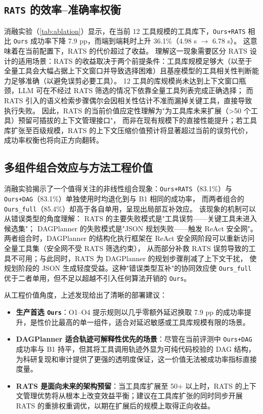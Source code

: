 \subsection{\texttt{RATS} 的效率--准确率权衡}\label{sec:analysis-rats}

消融实验（\autoref{tab:ablation}）显示，在当前 12 工具规模的工具库下，\texttt{Ours+RATS} 相比 \texttt{Ours} 成功率下降 7.9 pp，而端到端耗时上升 36.1\%（4.98 s $\to$ 6.78 s）。
这意味着在当前配置下，RATS 的代价超过了收益。
理解这一现象需要区分 RATS 设计的适用场景：RATS 的收益取决于两个前提条件：工具库规模足够大（以至于全量工具会大幅占据上下文窗口并导致选择困难）且基座模型的工具相关性判断能力足够准确（以避免误剪必要工具）。
12 工具的库规模尚未达到上下文窗口瓶颈，LLM 可在不经过 RATS 筛选的情况下依靠全量工具列表完成正确选择；
而 RATS 引入的语义检索步骤偶尔会因相关性估计不准而漏掉关键工具，直接导致执行失败。
因此，RATS 的当前价值应定性理解为"为工具库未来扩展（>50 个工具）预留可插拔的上下文管理接口"，
而非在现有规模下的直接性能提升；若工具库扩张至百级规模，RATS 的上下文压缩价值预计将显著超过当前的误剪代价，成功率权衡也将向正方向翻转。

\subsection{多组件组合效应与方法工程价值}\label{sec:analysis-combination}

消融实验揭示了一个值得关注的非线性组合现象：\texttt{Ours+RATS}（83.1\%）与 \texttt{Ours+DAG}（83.1\%）单独使用时均退化到与 B1 相同的成功率，
而两者组合的 \texttt{Ours\_full}（85.4\%）却高于各自单用，呈现出局部互补效应。
该现象的机制可以从错误类型的角度理解：
RATS 的主要失败模式是"工具误剪——关键工具未进入候选集"；
DAGPlanner 的失败模式是"JSON 规划失败——触发 ReAct 安全网"。
两者组合时，DAGPlanner 的结构化执行框架在 ReAct 安全网阶段可以重新访问全量工具集（安全网不受 RATS 筛选约束），
从而部分补救 RATS 误剪导致的工具不可用；与此同时，RATS 为 DAGPlanner 的规划步骤削减了上下文干扰，
使规划阶段的 JSON 生成轻度受益。这种"错误类型互补"的协同效应使 \texttt{Ours\_full} 优于二者单用，但不足以超越不引入任何算法开销的 \texttt{Ours}。

从工程价值角度，上述发现给出了清晰的部署建议：
\begin{itemize}
    \item \textbf{生产首选 \texttt{Ours}}：O1--O4 提示规则以几乎零额外延迟换取 7.9 pp 的成功率提升，是性价比最高的单一组件，适合对延迟敏感或工具库规模有限的场景。
    \item \textbf{DAGPlanner 适合轨迹可解释性优先的场景}：尽管在当前评测中 \texttt{Ours+DAG} 成功率与 B1 持平，但其将工具调用轨迹外显为可纯代码校验的 DAG 结构，为科研复现和审计提供了更强的透明度保证，这一价值无法被成功率指标直接度量。
    \item \textbf{RATS 是面向未来的架构预留}：当工具库扩展至 50+ 以上时，RATS 的上下文管理优势将从根本上改变效益平衡；建议在工具库扩张的同时同步开展 RATS 的重排权重调优，以期在扩展后的规模上取得正向收益。
\end{itemize}
